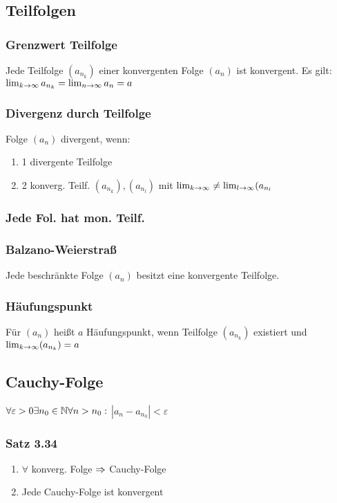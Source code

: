 \subsection*{Teilfolgen}
\subsubsection*{Grenzwert Teilfolge}
Jede Teilfolge $(a_{n_k})$ einer konvergenten Folge $(a_n)$ ist konvergent. Es gilt: $\lim_{k \rightarrow \infty} a_{n_k} = \lim_{n \rightarrow \infty} a_n = a$
\subsubsection*{Divergenz durch Teilfolge}
Folge $(a_n)$ divergent, wenn:
\begin{enumerate}[label=\alph*., noitemsep]
    \item 1 divergente Teilfolge
    \item 2 konverg. Teilf. $(a_{n_k}), (a_{n_l})$ mit $\lim_{k \rightarrow \infty} \neq \lim_{l \rightarrow \infty} (a_{n_l}$
\end{enumerate}
\subsubsection*{Jede Fol. hat mon. Teilf.}
\subsubsection*{Balzano-Weierstraß}
Jede beschränkte Folge $(a_n)$ besitzt eine konvergente Teilfolge.
\subsubsection*{Häufungspunkt}
Für $(a_n)$ heißt $a$ Häufungspunkt, wenn Teilfolge $(a_{n_k})$ existiert und $\lim_{k \rightarrow \infty} (a_{n_k}) = a$
\subsection*{Cauchy-Folge}
$\forall \varepsilon > 0 \exists n_0 \in \mathbb N \forall n > n_0:$ $|a_n - a_{n_0}| < \varepsilon$
\subsubsection*{Satz 3.34}
\begin{enumerate}[label=\alph*., noitemsep]
    \item $\forall$ konverg. Folge $\Rightarrow$ Cauchy-Folge
    \item Jede Cauchy-Folge ist konvergent
\end{enumerate}
